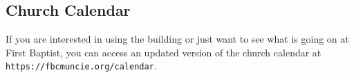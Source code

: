 \vspace{\fill}

\subsection{Church Calendar}
\label{church calendar}

If you are interested in using the building or just want to see what is going on at First Baptist, you can access an updated version of the church calendar at \texttt{https://fbcmuncie.org/calendar}.

\vspace{\fill}
